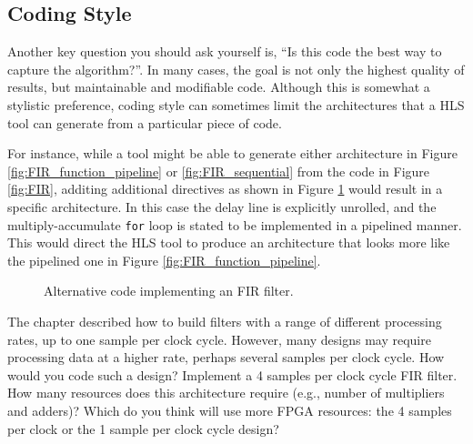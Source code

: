 %

\subsection{Coding Style}

Another key question you should ask yourself is, ``Is this code the best way to capture the algorithm?''.  In many cases, the goal is not only the highest quality of results, but maintainable and modifiable code.  Although this is somewhat a stylistic preference, coding style can sometimes limit the architectures that a HLS tool can generate from a particular piece of code.

For instance, while a tool might be able to generate either architecture in Figure \ref{fig:FIR_function_pipeline} or \ref{fig:FIR_sequential} from the code in Figure \ref{fig:FIR}, additing additional directives as shown in Figure \ref{fig:block_FIR} would result in a specific architecture. In this case the delay line is explicitly unrolled, and the multiply-accumulate \lstinline|for| loop is stated to be implemented in a pipelined manner. This would direct the HLS tool to produce an architecture that looks more like the pipelined one in Figure \ref{fig:FIR_function_pipeline}.

\begin{figure}

\caption{Alternative code implementing an FIR filter.}\label{fig:block_FIR}
\end{figure}




\begin{exercise}
The chapter described how to build filters with a range of different processing rates, up to one sample per clock cycle.  However, many designs may require processing data at a higher rate, perhaps several samples per clock cycle.  How would you code such a design?  Implement a 4 samples per clock cycle FIR filter.  How many resources does this architecture require (e.g., number of multipliers and adders)? Which do you think will use more FPGA resources: the 4 samples per clock or the 1 sample per clock cycle design?  
\end{exercise}

